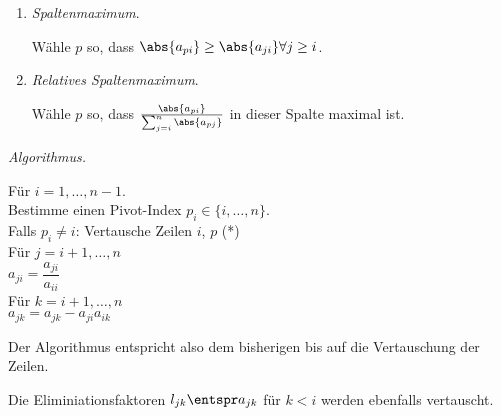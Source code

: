 \begin{bemn}[Pivotisierungssatrategien.]
\begin{enumerate}[label=\arabic{*}.)]
  \item \emph{Spaltenmaximum}.

Wähle $p$ so, dass $\abs{a_{pi}} \ge \abs{a_{ji}}\forall j\ge i$.
\item \emph{Relatives Spaltenmaximum}.

Wähle $p$ so, dass $\frac{\abs{a_{pi}}}{\sum_{j=i}^{n} \abs{a_{pj}}}$ in dieser
Spalte maximal ist.
\end{enumerate}
\end{bemn}
\textit{Algorithmus.}
\begin{tabbing}
\hspace{20pt}	Für $i=1,\ldots,n-1$.\\
\hspace{40pt}		Bestimme einen Pivot-Index $p_i\in\{i,\ldots,n\}$.\\
\hspace{40pt}		Falls $p_i\neq i$: Vertausche Zeilen $i$, $p$ (*)\\
\hspace{40pt}		Für $j=i+1,\ldots,n$\\
\hspace{60pt}			$a_{ji} = \dfrac{a_{ji}}{a_{ii}}$\\
\hspace{60pt}			Für $k=i+1,\ldots,n$\\
\hspace{80pt}				$a_{jk} = a_{jk}-a_{ji}a_{ik}$\\
\end{tabbing}
Der Algorithmus entspricht also dem bisherigen bis auf die Vertauschung der
Zeilen.

\begin{bemn}[Bemerkung zu (*).]
Die Eliminiationsfaktoren $l_{jk}\entspr a_{jk}$ für $k< i$ werden
ebenfalls vertauscht.\maphere
\end{bemn}

